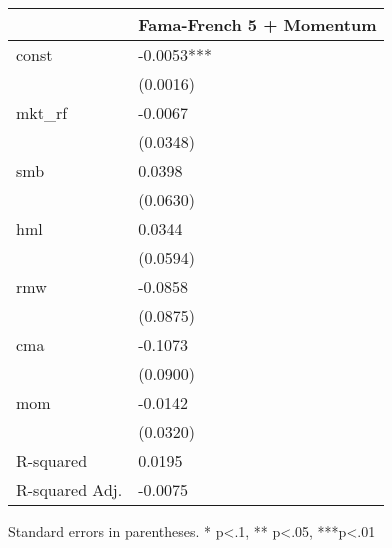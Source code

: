 \begin{table}
\caption{}
\label{}
\begin{center}
\begin{tabular}{ll}
\hline
               & Fama-French 5 + Momentum  \\
\hline
const          & -0.0053***                \\
               & (0.0016)                  \\
mkt\_rf        & -0.0067                   \\
               & (0.0348)                  \\
smb            & 0.0398                    \\
               & (0.0630)                  \\
hml            & 0.0344                    \\
               & (0.0594)                  \\
rmw            & -0.0858                   \\
               & (0.0875)                  \\
cma            & -0.1073                   \\
               & (0.0900)                  \\
mom            & -0.0142                   \\
               & (0.0320)                  \\
R-squared      & 0.0195                    \\
R-squared Adj. & -0.0075                   \\
\hline
\end{tabular}
\end{center}
\end{table}
\bigskip
Standard errors in parentheses. \newline 
* p<.1, ** p<.05, ***p<.01